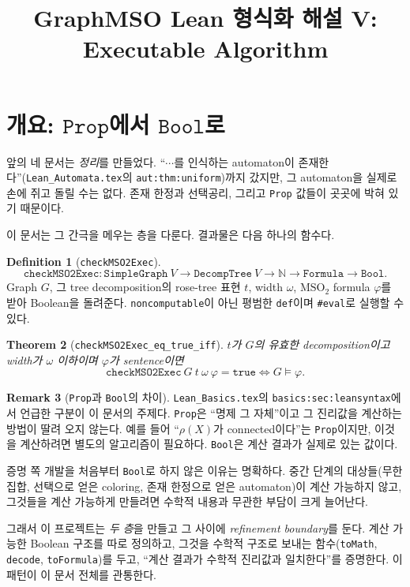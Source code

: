 \documentclass[11pt]{article}
\title{GraphMSO Lean 형식화 해설 V: Executable Algorithm}
\author{}
\date{}
\theoremstyle{definition}
\newtheorem{definition}{Definition}[section]
\newtheorem{remark}[definition]{Remark}
\theoremstyle{plain}
\newtheorem{theorem}[definition]{Theorem}
\newcommand{\MSOtwo}{\mathrm{MSO}_2}
\newcommand{\lean}[1]{\texttt{#1}}
\newcommand{\leanfile}[1]{\texttt{#1}}
\begin{document}
\maketitle

\tableofcontents

\section{개요: \texorpdfstring{$\lean{Prop}$}{Prop}에서 \texorpdfstring{$\lean{Bool}$}{Bool}로}
\label{alg:sec:overview}

앞의 네 문서는 \emph{정리}를 만들었다. ``$\cdots$를 인식하는 automaton이
존재한다''(\leanfile{Lean\_Automata.tex}의 \lean{aut:thm:uniform})까지 갔지만,
그 automaton을 실제로 손에 쥐고 돌릴 수는 없다. 존재 한정과 선택공리,
그리고 \lean{Prop} 값들이 곳곳에 박혀 있기 때문이다.

이 문서는 그 간극을 메우는 층을 다룬다. 결과물은 다음 하나의 함수다.

\begin{definition}[\lean{checkMSO2Exec}]
\label{alg:def:checkmso2exec}
\[
  \lean{checkMSO2Exec} : \lean{SimpleGraph}\ V \to \lean{DecompTree}\ V \to \mathbb{N} \to \lean{Formula} \to \lean{Bool}.
\]
Graph $G$, 그 tree decomposition의 rose-tree 표현 $t$, width $\omega$,
$\MSOtwo$ formula $\varphi$를 받아 Boolean을 돌려준다. \lean{noncomputable}이
아닌 평범한 \lean{def}이며 \lean{\#eval}로 실행할 수 있다.
\end{definition}

\begin{theorem}[\lean{checkMSO2Exec\_eq\_true\_iff}]
\label{alg:thm:main}
$t$가 $G$의 유효한 decomposition이고 width가 $\omega$ 이하이며 $\varphi$가
sentence이면
\[
  \lean{checkMSO2Exec}\ G\ t\ \omega\ \varphi = \lean{true}
  \iff
  G \models \varphi.
\]
\end{theorem}

\begin{remark}[\lean{Prop}과 \lean{Bool}의 차이]
\label{alg:rem:propvsbool}
\leanfile{Lean\_Basics.tex}의 \lean{basics:sec:leansyntax}에서 언급한 구분이
이 문서의 주제다. \lean{Prop}은 ``명제 그 자체''이고 그 진리값을 계산하는
방법이 딸려 오지 않는다. 예를 들어 ``$\rho(X)$가 connected이다''는
\lean{Prop}이지만, 이것을 계산하려면 별도의 알고리즘이 필요하다.
\lean{Bool}은 계산 결과가 실제로 있는 값이다.

증명 쪽 개발을 처음부터 \lean{Bool}로 하지 않은 이유는 명확하다. 중간 단계의
대상들(무한 집합, 선택으로 얻은 coloring, 존재 한정으로 얻은 automaton)이
계산 가능하지 않고, 그것들을 계산 가능하게 만들려면 수학적 내용과 무관한
부담이 크게 늘어난다.

그래서 이 프로젝트는 \emph{두 층}을 만들고 그 사이에 \emph{refinement
boundary}를 둔다. 계산 가능한 Boolean 구조를 따로 정의하고, 그것을 수학적
구조로 보내는 함수(\lean{toMath}, \lean{decode}, \lean{toFormula})를 두고,
``계산 결과가 수학적 진리값과 일치한다''를 증명한다. 이 패턴이 이 문서 전체를
관통한다.
\end{remark}
\end{document}
